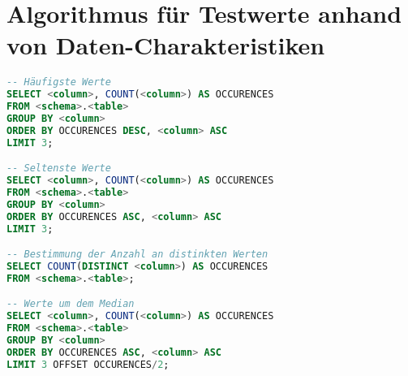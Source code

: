 \clearpage
\section{Algorithmus für Testwerte anhand von Daten-Charakteristiken}

\begin{lstlisting}[caption={Bestimmung von vorzuschlagenden Testwerten}, label={lst:distinctvalues}, language=SQL]
-- Häufigste Werte
SELECT <column>, COUNT(<column>) AS OCCURENCES
FROM <schema>.<table>
GROUP BY <column>
ORDER BY OCCURENCES DESC, <column> ASC
LIMIT 3;

-- Seltenste Werte
SELECT <column>, COUNT(<column>) AS OCCURENCES
FROM <schema>.<table>
GROUP BY <column>
ORDER BY OCCURENCES ASC, <column> ASC
LIMIT 3;

-- Bestimmung der Anzahl an distinkten Werten
SELECT COUNT(DISTINCT <column>) AS OCCURENCES
FROM <schema>.<table>;

-- Werte um dem Median
SELECT <column>, COUNT(<column>) AS OCCURENCES
FROM <schema>.<table>
GROUP BY <column>
ORDER BY OCCURENCES ASC, <column> ASC
LIMIT 3 OFFSET OCCURENCES/2;
\end{lstlisting}